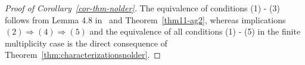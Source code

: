 \documentclass[11pt,a4paper,reqno]{amsart}
\newtheorem{cor}[theorem]{Corollary}
\theoremstyle{definition}
\renewcommand{\a}{\operatorname{a}}
\newcommand{\B}{\mathbb{B}^n}
\newcommand{\Nm}{\mathcal{N}}
\newcommand{\R}{\mathbb{R}}
\newcommand{\ud}{\mathrm {d}}
\newcommand{\Sn}{\mathbb{S}^{n-1}}
\numberwithin{komcounter}{section}
\begin{document}
%
%
%
\begin{proof}[Proof of Corollary~\ref{cor-thm-nolder}]
 The equivalence of conditions (1) - (3) follows from Lemma 4.8 in~\cite{ag2} and Theorem~\ref{thm11-ag2}, whereas implications $(2) \Rightarrow (4) \Rightarrow (5)$ and the equivalence of all conditions (1) - (5) in the finite multiplicity case is the direct consequence of Theorem~\ref{thm:characterizationsnolder}. 
\end{proof}
\end{document}
